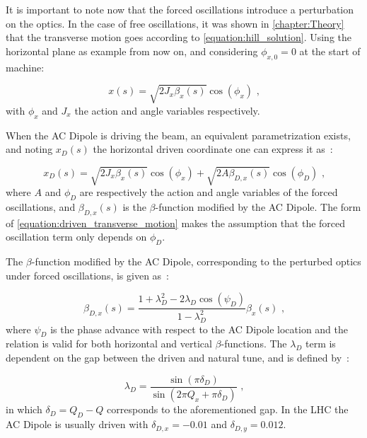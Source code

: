 It is important to note now that the forced oscillations introduce a perturbation on the optics.
In the case of free oscillations, it was shown in \cref{chapter:Theory} that the transverse motion goes according to \cref{equation:hill_solution}.
Using the horizontal plane as example from now on, and considering \(\phi_{x,0} = 0\) at the start of machine:

\begin{equation}
  x(s) = \sqrt{2 J_x \beta_x(s)} \cos \left( \phi_x \right) \text{ ,}
\end{equation}
with \(\phi_x\) and \(J_x\) the action and angle variables respectively.

When the AC Dipole is driving the beam, an equivalent parametrization exists, and noting \(x_D(s)\) the horizontal driven coordinate one can express it as~\cite{PHD:Miyamoto,PRAB:Tomas:Normal_Form_Particle_Motion_AC_Dipole}:

\begin{equation}
  x_D(s)=\sqrt{2 J_x \beta_x(s)} \cos \left( \phi_x \right) + \sqrt{2 A \beta_{D,x}(s)} \cos \left( \phi_D \right) \text{ ,}
  \label{equation:driven_transverse_motion}
\end{equation}
where \(A\) and \(\phi_D\) are respectively the action and angle variables of the forced oscillations, and \(\beta_{D,x}(s)\) is the \(\beta\)-function modified by the AC Dipole.
The form of \cref{equation:driven_transverse_motion} makes the assumption that the forced oscillation term only depends on \(\phi_D\).

The \(\beta\)-function modified by the AC Dipole, corresponding to the perturbed optics under forced oscillations, is given as~\cite{PRAB:Miyamoto:Parametrization_Driven_Betatron_Oscillation}:

\begin{equation}
  \beta_{D,x}(s) = \frac{1 + \lambda_D^2 - 2 \lambda_D \cos \left(\psi_D\right)}{1 - \lambda_D^2} \beta_x(s) \text{ ,}
  \label{equation:driven_beta_function}
\end{equation}
where \(\psi_D\) is the phase advance with respect to the AC Dipole location and the relation is valid for both horizontal and vertical \(\beta\)-functions.
The \(\lambda_D\) term is dependent on the gap between the driven and natural tune, and is defined by~\cite{PRAB:Miyamoto:Parametrization_Driven_Betatron_Oscillation}:

\begin{equation}
  \lambda_D = \frac{\sin \left(\pi \delta_D \right)}{\sin \left(2 \pi Q_x + \pi \delta_D \right)} \text{ ,}
  \label{equation:driven_oscillations_lambda_D}
\end{equation}
in which \(\delta_D = Q_D - Q\) corresponds to the aforementioned gap.
In the LHC the AC Dipole is usually driven with \(\delta_{D,x} = -0.01\) and \(\delta_{D,y} = 0.012\).


